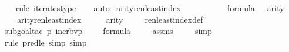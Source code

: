 \begin{isabellebody}
\ \ \isamarkupfalse%
{\isacharparenleft}{\kern0pt}rule\ iterates{\isacharunderscore}{\kern0pt}type{\isacharparenright}{\kern0pt}\isanewline
\ \ \isamarkupfalse%
\ auto%
\endisatagproof
{\isafoldproof}%
%
\isadelimproof
\isanewline
%
\endisadelimproof
\isanewline
{}\isamarkupfalse%
\ arity{\isacharunderscore}{\kern0pt}ren{\isacharunderscore}{\kern0pt}least{\isacharunderscore}{\kern0pt}index\ {\isacharcolon}{\kern0pt}\ \isanewline
\ \ \ {\isasymphi}\isanewline
\ \ \ {\isachardoublequoteopen}{\isasymphi}\ {\isasymin}\ formula{\isachardoublequoteclose}\ {\isachardoublequoteopen}{}\ {\isacharless}{\kern0pt}\ arity{\isacharparenleft}{\kern0pt}{\isasymphi}{\isacharparenright}{\kern0pt}{\isachardoublequoteclose}\ \isanewline
\ \ \ {\isachardoublequoteopen}arity{\isacharparenleft}{\kern0pt}ren{\isacharunderscore}{\kern0pt}least{\isacharunderscore}{\kern0pt}index{\isacharparenleft}{\kern0pt}{\isasymphi}{\isacharparenright}{\kern0pt}{\isacharparenright}{\kern0pt}\ {\isasymle}\ {}{}\ {\isasymunion}\ {\isacharparenleft}{\kern0pt}{}\ {\isacharhash}{\kern0pt}{\isacharplus}{\kern0pt}\ arity{\isacharparenleft}{\kern0pt}{\isasymphi}{\isacharparenright}{\kern0pt}{\isacharparenright}{\kern0pt}{\isachardoublequoteclose}\ \isanewline
%
\isadelimproof
\isanewline
\ \ %
\endisadelimproof
%
\isatagproof
{}\isamarkupfalse%
\ ren{\isacharunderscore}{\kern0pt}least{\isacharunderscore}{\kern0pt}index{\isacharunderscore}{\kern0pt}def\ \isanewline
\ \ \isamarkupfalse%
{\isacharparenleft}{\kern0pt}subgoal{\isacharunderscore}{\kern0pt}tac\ {\isachardoublequoteopen}{\isacharparenleft}{\kern0pt}{\isasymlambda}p{\isachardot}{\kern0pt}\ incr{\isacharunderscore}{\kern0pt}bv{\isacharparenleft}{\kern0pt}p{\isacharparenright}{\kern0pt}\ {\isacharbackquote}{\kern0pt}\ {}{\isacharparenright}{\kern0pt}{\isacharcircum}{\kern0pt}{}{}\ {\isacharparenleft}{\kern0pt}{\isasymphi}{\isacharparenright}{\kern0pt}\ {\isasymin}\ formula{\isachardoublequoteclose}{\isacharparenright}{\kern0pt}\ \isanewline
\ \ \isamarkupfalse%
\ assms\isanewline
\ \ \ \isamarkupfalse%
\ simp\isanewline
\ \ \ \isamarkupfalse%
{\isacharparenleft}{\kern0pt}rule\ pred{\isacharunderscore}{\kern0pt}le{\isacharcomma}{\kern0pt}\ simp{\isacharcomma}{\kern0pt}\ simp{\isacharparenright}{\kern0pt}{\isacharplus}{\kern0pt}\isanewline
\ \ \ \isamarkupfalse%

\end{isabellebody}
